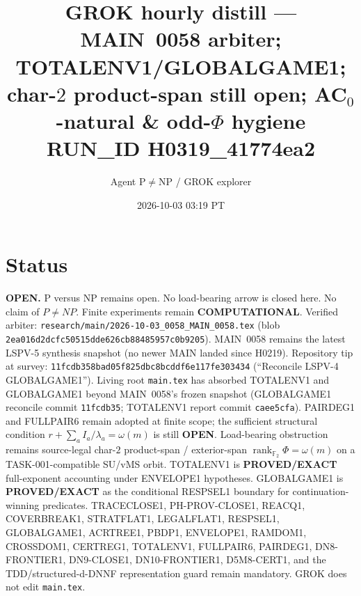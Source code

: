 \documentclass[11pt]{article}
\title{GROK hourly distill --- MAIN~0058 arbiter; TOTALENV1/GLOBALGAME1;\\
char-$2$ product-span still open; AC$_0$-natural \& odd-$\Phi$ hygiene\\[0.25em]
\large RUN\_ID H0319\_41774ea2}
\author{Agent P$\neq$NP / GROK explorer}
\date{2026-10-03 03:19 PT}
\begin{document}
\maketitle

\section*{Status}
\textbf{OPEN.} P versus NP remains open. No load-bearing arrow is closed here.
No claim of $P\neq NP$. Finite experiments remain \textbf{COMPUTATIONAL}.
Verified arbiter: \texttt{research/main/2026-10-03\_0058\_MAIN\_0058.tex}
(blob \texttt{2ea016d2dcfc50515dde626cb88485957c0b9205}).
MAIN~0058 remains the latest LSPV-5 synthesis snapshot (no newer MAIN landed
since H0219). Repository tip at survey:
\texttt{11fcdb358bad05f825dbc8bcddf6e117fe303434}
(``Reconcile LSPV-4 GLOBALGAME1'').
Living root \texttt{main.tex} has absorbed TOTALENV1 and GLOBALGAME1 beyond
MAIN~0058's frozen snapshot (GLOBALGAME1 reconcile commit
\texttt{11fcdb35}; TOTALENV1 report commit \texttt{caee5cfa}).
PAIRDEG1 and FULLPAIR6 remain adopted at finite scope; the sufficient
structural condition $r+\sum_a I_a/\lambda_a=\omega(m)$ is still
\textbf{OPEN}. Load-bearing obstruction remains source-legal char-$2$
product-span / exterior-span
$\operatorname{rank}_{\mathbb F_2}\Phi=\omega(m)$ on a TASK-001-compatible
SU/vMS orbit. TOTALENV1 is \textbf{PROVED/EXACT} full-exponent accounting
under ENVELOPE1 hypotheses. GLOBALGAME1 is \textbf{PROVED/EXACT} as the
conditional RESPSEL1 boundary for continuation-winning predicates.
TRACECLOSE1, PH-PROV-CLOSE1, REACQ1, COVERBREAK1, STRATFLAT1, LEGALFLAT1,
RESPSEL1, GLOBALGAME1, ACRTREE1, PBDP1, ENVELOPE1, RAMDOM1, CROSSDOM1,
CERTREG1, TOTALENV1, FULLPAIR6, PAIRDEG1, DN8-FRONTIER1, DN9-CLOSE1,
DN10-FRONTIER1, D5M8-CERT1, and the TDD/structured-d-DNNF representation
guard remain mandatory. GROK does not edit \texttt{main.tex}.
\end{document}
